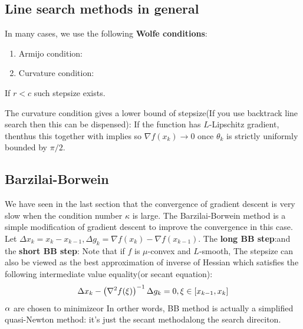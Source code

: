 \documentclass[a4paper]{mynotes}
\begin{document}
\subsection{Line search methods in general}
In many cases, we use the following \textbf{Wolfe conditions}:
\begin{enumerate}
 \item Armijo condition: 
  \item Curvature condition:
\end{enumerate}
If $r<c$ such stepsize exists. 

The curvature condition gives a lower bound of stepsize(If you use backtrack line search then this can be dispensed): 
If the function has $L$-Lipschitz gradient, thenthus
this together with
implies 
so $\nabla f(x_k)\to 0$ once $\theta_k$ is strictly uniformly bounded by $\pi/2$.


\subsection{Barzilai-Borwein}
We have seen in the last section that the convergence of gradient descent is very slow when the condition number $\kappa$ is large. The Barzilai-Borwein method is a simple modification of gradient descent to improve the convergence in this case. Let $\Delta x_k=x_k-x_{k-1},\Delta g_k=\nabla f(x_k)-\nabla f(x_{k-1})$. The \textbf{long BB step}:and the \textbf{short BB step}:
Note that if $f$ is $\mu$-convex and $L$-smooth, 
The stepsize can also be viewed as the best approximation of inverse of Hessian which satisfies the following intermediate value equality(or secant equation): $$\Delta x_k-\yk{\nabla^2 f(\xi)}^{-1}\Delta g_k=0 ,\xi\in[x_{k-1},x_k]$$
$\aa$ are chosen to minimizeor 
In orther words, BB method is actually a simplified quasi-Newton method: it's just the secant methodalong the search direciton.
\end{document}
